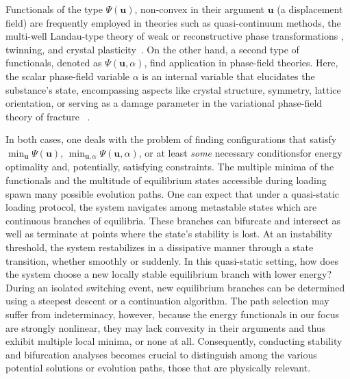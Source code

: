 Functionals of the type $\Psi(\mathbf u)$, non-convex in their argument  $\mathbf u$ (a displacement field) are frequently employed in theories such as quasi-continuum methods, the multi-well Landau-type theory of weak or reconstructive phase transformations , twinning, and crystal plasticity~\cite{Tadmor1996-qi,Lookman2003-gd,Conti2004-yj,Finel2010-zw,Clayton2011-xq,Salman2019-cg,Baggio2019-rs,Baggio2023-qu}. On the other hand, a second type of functionals, denoted as $\Psi(\mathbf u, \alpha)$, find application in phase-field theories. Here, the scalar phase-field variable $\alpha$ is an internal variable that elucidates the substance's state, encompassing aspects like crystal structure, symmetry, lattice orientation, \cite{Finel2010-zw,Ruffini2015-pn,Javanbakht2016-dr} or serving as a damage parameter in the variational phase-field theory of fracture ~\cite{francfort_marigo1998,Salman2021-mn}. 

In both cases, one deals with the problem of finding  configurations that satisfy $\min_{\boldsymbol{u}} \Psi(\boldsymbol{u})$, $\min_{\boldsymbol{u},\alpha} \Psi(\boldsymbol{u},\alpha)$, or at least \emph{some} necessary conditionsfor energy optimality and, potentially, satisfying constraints. 
The multiple minima of the functionals and the multitude of equilibrium states accessible during loading spawn many possible evolution paths. One can expect that under a quasi-static loading protocol, the system navigates among metastable states which are continuous branches of equilibria. These branches can bifurcate and intersect as well as terminate at points where the state’s stability is lost.
At an instability threshold, the system restabilizes in a dissipative manner through a state transition, whether smoothly or suddenly.
In this quasi-static setting, how does the system choose a new locally stable equilibrium branch with lower energy?
During an isolated switching event, new equilibrium branches can be determined using a steepest descent or a continuation algorithm. The path selection may suffer from indeterminacy, however, because the energy functionals in our focus are strongly nonlinear, they may lack convexity in their arguments and thus exhibit multiple local minima, or none at all. Consequently, conducting stability and bifurcation analyses becomes crucial to distinguish among the various potential solutions or evolution paths, those that are physically relevant.

